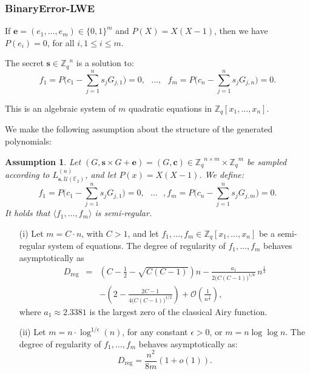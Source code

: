 \documentclass[10pt]{beamer}
\newcommand{\Dreg}{D_{\mathrm{reg}}}
\newcommand{\bigO}[1]{\ensuremath{\mathcal{O}\left({#1}\right)}\xspace}
\newcommand{\Zq}{\ensuremath{\mathbb{Z}_q}}
\newcommand{\bLdis}{L_{\mathbf{s},\mathcal{U}(\mathbb{F}_2)}^{(n)}}
\newcommand{\svec}{\ensuremath{\mathbf{s}}\xspace}
\newcommand{\nbvar}{n}
\newcommand{\nbeq}{m}
\newtheorem{assumption}{Assumption}
\begin{document}
\begin{frame}[allowframebreaks]
\frametitle{BinaryError-LWE}

If $\mathbf{e}=(e_1,\ldots,e_{\nbeq}) \in  \{0,1\}^{\nbeq}$ and $P(X)=X (X-1)$, then we have $P(e_i) = 0$, for all $i, 1 \leq i \leq \nbeq$.

\vspace{1em}

The secret $\svec\in \Zq^{\nbvar}$ is a solution to:
\begin{equation}
\label{agequation_pre}
f_1=P\big(c_1-\sum_{j=1}^{\nbvar}s_j G_{j, 1}\big)=0, \mbox{  } \ldots, \mbox{  } f_{\nbeq}=P\big(c_n-\sum_{j=1}^{\nbvar}s_j G_{j, \nbvar}\big)=0. 
\end{equation} 

\vspace{1em}

This is an algebraic system of $\nbeq$ quadratic equations in $\Zq[x_1,\ldots,x_{\nbvar}].$ 

\framebreak

We make the following assumption about the structure of the generated polynomials: 

\begin{assumption}\label{ass:semi-regular}
Let $(G,\svec \times G+\mathbf{e})=(G,\mathbf{c}) \in \Zq^{\nbvar \times  \nbeq}\times \Zq^{\nbeq}$  be sampled according to $\bLdis$, and let $P(x) = X(X-1)$. We define:
\begin{equation*}
\label{agequation-f2}
f_1=P\big(c_1-\sum_{j=1}^{\nbvar}s_j G_{j,1}\big)=0, \mbox{  } \ldots \mbox{  },f_{\nbeq}=P\big(c_n-\sum_{j=1}^{\nbvar}s_j G_{j,\nbeq}\big)=0.
\end{equation*}
It holds that $\langle f_1 ,\ldots,f_{m} \rangle$ is semi-regular. 
\end{assumption}

\framebreak

\begin{theorem}\label{theo:reg}
\begin{itemize}
\item[(i)] Let $\nbeq=C\cdot \nbvar$, with $C >1$, and let $f_1 ,\ldots,f_{\nbeq} \in 
\Zq[x_1,\ldots,x_{\nbvar}] $ be a semi-regular system of equations. The degree of regularity 
of $f_1 ,\ldots,f_{\nbeq}$ behaves  asymptotically as
\begin{eqnarray*}
\Dreg &=& \left(C-\frac 1 2-\sqrt{C(C-1)}\right)\nbvar - \frac{a_1}{2\big(C(C-1)\big)^{1/6}} \, \nbvar^{\frac 1 3}\\
      & & -\left(2-\frac{2C-1}{4\big(C(C-1)\big)^{1/2}} \right)+\bigO{\frac{1}{\nbvar^{\frac 1 3}}},  
\end{eqnarray*}
where $a_1 \approx 2.3381$ is the largest zero of the classical Airy function.
\item[(ii)] Let $\nbeq=\nbvar \cdot \log^{1/{\epsilon}}(\nbvar)$, for any constant $\epsilon>0$, or  $\nbeq=\nbvar \log \log \nbvar$. 
The degree of regularity of $f_1 ,\ldots,f_{\nbeq}$ behaves 
asymptotically as:
$$ 
\Dreg=\frac{\nbvar^2}{8\nbeq}\left(1+o(1)\right).   
$$
\end{itemize}
\end{theorem}


\end{frame}
\end{document}
